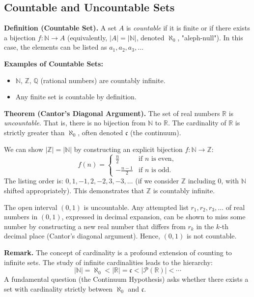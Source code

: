 \documentclass[11pt,a4paper]{article}
\begin{document}
\subsection{Countable and Uncountable Sets}

\textbf{Definition (Countable Set).} A set $A$ is \textit{countable} if it is finite or if there exists a bijection $f: \mathbb{N} \to A$ (equivalently, $|A| = |\mathbb{N}|$, denoted $\aleph_0$, "aleph-null"). In this case, the elements can be listed as $a_1, a_2, a_3, \dots$

\textbf{Examples of Countable Sets:}
\begin{itemize}[label=--]
    \item $\mathbb{N}$, $\mathbb{Z}$, $\mathbb{Q}$ (rational numbers) are countably infinite.
    \item Any finite set is countable by definition.
\end{itemize}

\textbf{Theorem (Cantor's Diagonal Argument).} The set of real numbers $\mathbb{R}$ is \textit{uncountable}. That is, there is no bijection from $\mathbb{N}$ to $\mathbb{R}$. The cardinality of $\mathbb{R}$ is strictly greater than $\aleph_0$, often denoted $\mathfrak{c}$ (the continuum).

\begin{example}
We can show $|\mathbb{Z}| = |\mathbb{N}|$ by constructing an explicit bijection $f: \mathbb{N} \to \mathbb{Z}$:
\begin{equation*}
    f(n) = \begin{cases}
        \frac{n}{2} & \text{if } n \text{ is even}, \\[4pt]
        -\frac{n-1}{2} & \text{if } n \text{ is odd}.
    \end{cases}
\end{equation*}
The listing order is: $0, 1, -1, 2, -2, 3, -3, \dots$ (if we consider $\mathbb{Z}$ including 0, with $\mathbb{N}$ shifted appropriately). This demonstrates that $\mathbb{Z}$ is countably infinite.
\end{example}

\begin{example}
The open interval $(0, 1)$ is uncountable. Any attempted list $r_1, r_2, r_3, \dots$ of real numbers in $(0, 1)$, expressed in decimal expansion, can be shown to miss some number by constructing a new real number that differs from $r_k$ in the $k$-th decimal place (Cantor's diagonal argument). Hence, $(0,1)$ is not countable.
\end{example}

\textbf{Remark.} The concept of cardinality is a profound extension of counting to infinite sets. The study of infinite cardinalities leads to the hierarchy:
\begin{equation*}
    |\mathbb{N}| = \aleph_0 < |\mathbb{R}| = \mathfrak{c} < |\mathcal{P}(\mathbb{R})| < \cdots
\end{equation*}
A fundamental question (the Continuum Hypothesis) asks whether there exists a set with cardinality strictly between $\aleph_0$ and $\mathfrak{c}$.
\end{document}
